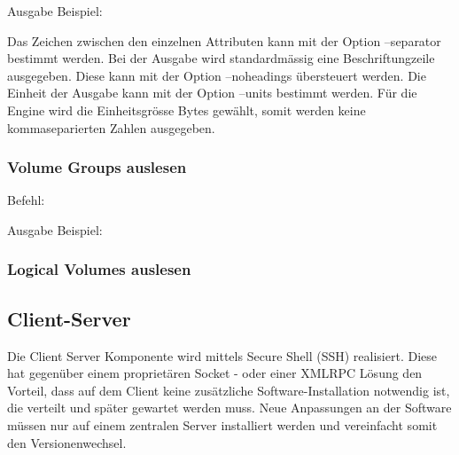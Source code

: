 Ausgabe Beispiel:\newline
{}

Das Zeichen zwischen den einzelnen Attributen kann mit der Option --separator bestimmt werden. Bei der Ausgabe wird standardmässig eine Beschriftungzeile ausgegeben. Diese kann mit der Option --noheadings übersteuert werden. Die Einheit der Ausgabe kann mit der Option --units bestimmt werden. Für die Engine wird die Einheitsgrösse Bytes gewählt, somit werden keine kommaseparierten Zahlen ausgegeben.

\subsubsection{Volume Groups auslesen}

Befehl:\newline
{}

Ausgabe Beispiel:\newline
{}

\subsubsection{Logical Volumes auslesen}





\subsection{Client-Server}
Die Client Server Komponente wird mittels Secure Shell (SSH) realisiert. Diese hat gegenüber einem proprietären Socket - oder einer XMLRPC Lösung den Vorteil, dass auf dem Client keine zusätzliche Software-Installation notwendig ist, die verteilt und später gewartet werden muss. Neue Anpassungen an der Software müssen nur auf einem zentralen Server installiert werden und vereinfacht somit den Versionenwechsel.

